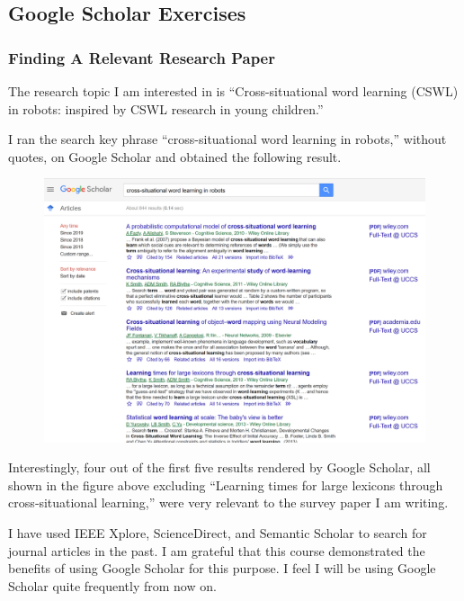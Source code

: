 \documentclass[journal]{IEEEtran}
\begin{document}
\subsection{Google Scholar Exercises}  
\label{sec:googlescholar}

\subsubsection{Finding A Relevant Research Paper}

The research topic I am interested in is ``Cross-situational word learning (CSWL) in robots: inspired by CSWL research in young children.''

I ran the search key phrase ``cross-situational word learning in robots,'' without quotes, on Google Scholar and obtained the following result.  

\begin{figure}[H]
	\begin{center}
		\includegraphics[width=0.9\linewidth]{images/fig3}
	\end{center}
	\captionsetup{labelformat=empty}
\end{figure}  

Interestingly, four out of the first five results rendered by Google Scholar, all shown in the figure above excluding ``Learning times for large lexicons through cross‐situational learning,'' were very relevant to the survey paper I am writing.  

I have used IEEE Xplore, ScienceDirect, and Semantic Scholar to search for journal articles in the past. I am grateful that this course demonstrated the benefits of using Google Scholar for this purpose. I feel I will be using Google Scholar quite frequently from now on.      
\end{document}
